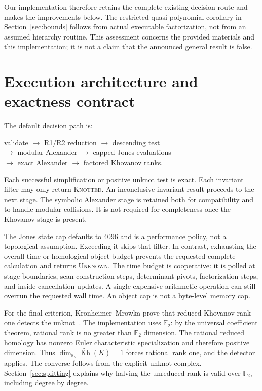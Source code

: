 \documentclass[11pt,letterpaper]{article}
\theoremstyle{definition}\newtheorem{definition}[theorem]{Definition}
\theoremstyle{remark}\newtheorem{remark}[theorem]{Remark}
\newcommand{\F}{\mathbb F}
\newcommand{\rKh}{\widetilde{\operatorname{Kh}}}
\newcommand{\KNOTTED}{\textsc{Knotted}}
\newcommand{\UNKNOWN}{\textsc{Unknown}}
\begin{document}
Our implementation therefore retains the complete existing decision route and
makes the improvements below. The restricted quasi-polynomial corollary in
Section~\ref{sec:bounds} follows from actual executable factorization, not from
an assumed hierarchy routine. This assessment concerns the provided materials
and this implementation; it is not a claim that the announced general result
is false.

\section{Execution architecture and exactness contract}

The default decision path is:
\begin{center}
\small
validate $\longrightarrow$ R1/R2 reduction $\longrightarrow$ descending test\\[3pt]
$\longrightarrow$ modular Alexander $\longrightarrow$ capped Jones evaluations\\[3pt]
$\longrightarrow$ exact Alexander $\longrightarrow$ factored Khovanov ranks.
\end{center}
Each successful simplification or positive unknot test is exact. Each invariant
filter may only return \KNOTTED. An inconclusive invariant result proceeds to
the next stage. The symbolic Alexander stage is retained both for compatibility
and to handle modular collisions. It is not required for completeness once the
Khovanov stage is present.

The Jones state cap defaults to 4096 and is a performance policy, not a
topological assumption. Exceeding it skips that filter. In contrast, exhausting
the overall time or homological-object budget prevents the requested complete
calculation and returns \UNKNOWN. The time budget is cooperative: it is polled
at stage boundaries, scan construction steps, determinant pivots, factorization
steps, and inside cancellation updates. A single expensive arithmetic operation
can still overrun the requested wall time. An object cap is not a byte-level
memory cap.

For the final criterion, Kronheimer--Mrowka prove that reduced Khovanov rank one
detects the unknot~\cite{km}. The implementation uses $\F_2$: by the universal
coefficient theorem, rational rank is no greater than $\F_2$ dimension. The
rational reduced homology has nonzero Euler characteristic specialization and
therefore positive dimension. Thus $\dim_{\F_2}\rKh(K)=1$ forces rational rank
one, and the detector applies. The converse follows from the explicit unknot
complex. Section~\ref{sec:splitting} explains why halving the unreduced rank is
valid over $\F_2$, including degree by degree.
\end{document}
